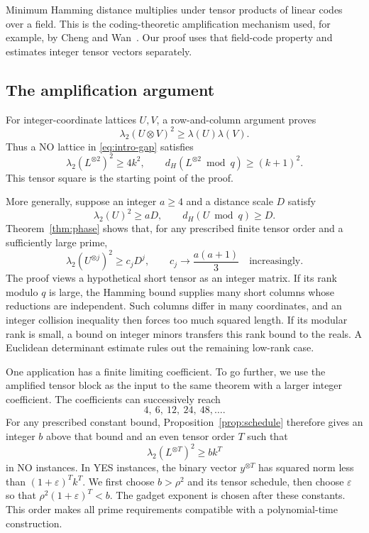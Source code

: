 \documentclass[11pt,letterpaper]{article}
\numberwithin{equation}{section}
\theoremstyle{definition}
\theoremstyle{remark}
\begin{document}
Minimum Hamming distance multiplies under tensor products of linear codes over a field. This is the coding-theoretic amplification mechanism used, for example, by Cheng and Wan~\cite{cw}. Our proof uses that field-code property and estimates integer tensor vectors separately.

\subsection{The amplification argument}
For integer-coordinate lattices $U,V$, a row-and-column argument proves
\begin{equation}\label{eq:intro-seed}
 \lambda_2(U\otimes V)^2\ge\lambda(U)\lambda(V).
\end{equation}
Thus a NO lattice in \eqref{eq:intro-gap} satisfies
\[
 \lambda_2(L^{\otimes2})^2\ge4k^2,
 \qquad d_H(L^{\otimes2}\bmod q)\ge(k+1)^2.
\]
This tensor square is the starting point of the proof.

More generally, suppose an integer $a\ge4$ and a distance scale $D$ satisfy
\[
 \lambda_2(U)^2\ge aD,\qquad d_H(U\bmod q)\ge D.
\]
Theorem~\ref{thm:phase} shows that, for any prescribed finite tensor order and a sufficiently large prime,
\[
 \lambda_2(U^{\otimes j})^2\ge c_jD^j,
 \qquad c_j\longrightarrow\frac{a(a+1)}3
 \quad\text{increasingly}.
\]
The proof views a hypothetical short tensor as an integer matrix. If its rank modulo $q$ is large, the Hamming bound supplies many short columns whose reductions are independent. Such columns differ in many coordinates, and an integer collision inequality then forces too much squared length. If its modular rank is small, a bound on integer minors transfers this rank bound to the reals. A Euclidean determinant estimate rules out the remaining low-rank case.

One application has a finite limiting coefficient. To go further, we use the amplified tensor block as the input to the same theorem with a larger integer coefficient. The coefficients can successively reach
\[
 4,\ 6,\ 12,\ 24,\ 48,\ldots.
\]
For any prescribed constant bound, Proposition~\ref{prop:schedule} therefore gives an integer $b$ above that bound and an even tensor order $T$ such that
\begin{equation}\label{eq:intro-tensor}
 \lambda_2(L^{\otimes T})^2\ge bk^T
\end{equation}
in NO instances. In YES instances, the binary vector $y^{\otimes T}$ has squared norm less than $(1+\varepsilon)^Tk^T$. We first choose $b>\rho^2$ and its tensor schedule, then choose $\varepsilon$ so that $\rho^2(1+\varepsilon)^T<b$. The gadget exponent is chosen after these constants. This order makes all prime requirements compatible with a polynomial-time construction.
\end{document}
